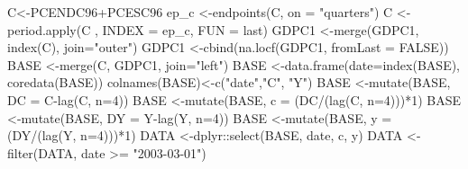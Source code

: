 \documentclass[
]{book}
\newenvironment{Shaded}{\begin{snugshade}}{\end{snugshade}}
\newcommand{\AttributeTok}[1]{\textcolor[rgb]{0.77,0.63,0.00}{#1}}
\newcommand{\ConstantTok}[1]{\textcolor[rgb]{0.00,0.00,0.00}{#1}}
\newcommand{\DecValTok}[1]{\textcolor[rgb]{0.00,0.00,0.81}{#1}}
\newcommand{\FunctionTok}[1]{\textcolor[rgb]{0.00,0.00,0.00}{#1}}
\newcommand{\NormalTok}[1]{#1}
\newcommand{\OtherTok}[1]{\textcolor[rgb]{0.56,0.35,0.01}{#1}}
\newcommand{\SpecialCharTok}[1]{\textcolor[rgb]{0.00,0.00,0.00}{#1}}
\newcommand{\StringTok}[1]{\textcolor[rgb]{0.31,0.60,0.02}{#1}}
\begin{document}
\begin{Shaded}
\begin{Highlighting}[]
\NormalTok{C}\OtherTok{\textless{}{-}}\NormalTok{PCENDC96}\SpecialCharTok{+}\NormalTok{PCESC96}
\NormalTok{ep\_c       }\OtherTok{\textless{}{-}}\FunctionTok{endpoints}\NormalTok{(C, }\AttributeTok{on =} \StringTok{"quarters"}\NormalTok{)}
\NormalTok{C          }\OtherTok{\textless{}{-}}\FunctionTok{period.apply}\NormalTok{(C , }\AttributeTok{INDEX =}\NormalTok{ ep\_c, }\AttributeTok{FUN =}\NormalTok{ last)}
\NormalTok{GDPC1      }\OtherTok{\textless{}{-}}\FunctionTok{merge}\NormalTok{(GDPC1, }\FunctionTok{index}\NormalTok{(C), }\AttributeTok{join=}\StringTok{"outer"}\NormalTok{)}
\NormalTok{GDPC1      }\OtherTok{\textless{}{-}}\FunctionTok{cbind}\NormalTok{(}\FunctionTok{na.locf}\NormalTok{(GDPC1, }\AttributeTok{fromLast =} \ConstantTok{FALSE}\NormalTok{))}
\NormalTok{BASE       }\OtherTok{\textless{}{-}}\FunctionTok{merge}\NormalTok{(C, GDPC1, }\AttributeTok{join=}\StringTok{"left"}\NormalTok{)}
\NormalTok{BASE       }\OtherTok{\textless{}{-}}\FunctionTok{data.frame}\NormalTok{(}\AttributeTok{date=}\FunctionTok{index}\NormalTok{(BASE), }\FunctionTok{coredata}\NormalTok{(BASE))}
\FunctionTok{colnames}\NormalTok{(BASE)}\OtherTok{\textless{}{-}}\FunctionTok{c}\NormalTok{(}\StringTok{"date"}\NormalTok{,}\StringTok{"C"}\NormalTok{, }\StringTok{"Y"}\NormalTok{)}
\NormalTok{BASE    }\OtherTok{\textless{}{-}}\FunctionTok{mutate}\NormalTok{(BASE, }\AttributeTok{DC       =}\NormalTok{  C}\SpecialCharTok{{-}}\FunctionTok{lag}\NormalTok{(C, }\AttributeTok{n=}\DecValTok{4}\NormalTok{))}
\NormalTok{BASE    }\OtherTok{\textless{}{-}}\FunctionTok{mutate}\NormalTok{(BASE, }\AttributeTok{c        =}\NormalTok{ (DC}\SpecialCharTok{/}\NormalTok{(}\FunctionTok{lag}\NormalTok{(C, }\AttributeTok{n=}\DecValTok{4}\NormalTok{)))}\SpecialCharTok{*}\DecValTok{1}\NormalTok{)}
\NormalTok{BASE    }\OtherTok{\textless{}{-}}\FunctionTok{mutate}\NormalTok{(BASE, }\AttributeTok{DY       =}\NormalTok{  Y}\SpecialCharTok{{-}}\FunctionTok{lag}\NormalTok{(Y, }\AttributeTok{n=}\DecValTok{4}\NormalTok{))}
\NormalTok{BASE    }\OtherTok{\textless{}{-}}\FunctionTok{mutate}\NormalTok{(BASE, }\AttributeTok{y        =}\NormalTok{ (DY}\SpecialCharTok{/}\NormalTok{(}\FunctionTok{lag}\NormalTok{(Y, }\AttributeTok{n=}\DecValTok{4}\NormalTok{)))}\SpecialCharTok{*}\DecValTok{1}\NormalTok{)}
\NormalTok{DATA    }\OtherTok{\textless{}{-}}\NormalTok{dplyr}\SpecialCharTok{::}\FunctionTok{select}\NormalTok{(BASE, date, c, y)}
\NormalTok{DATA    }\OtherTok{\textless{}{-}}\FunctionTok{filter}\NormalTok{(DATA, date }\SpecialCharTok{\textgreater{}=} \StringTok{"2003{-}03{-}01"}\NormalTok{)}

\end{Highlighting}
\end{Shaded}
\end{document}
